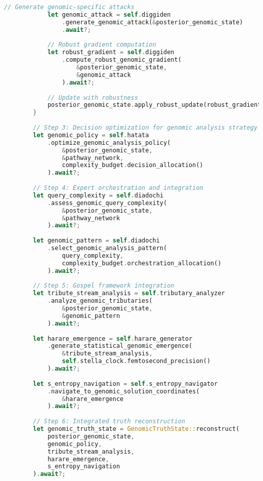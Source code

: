 \documentclass[12pt,a4paper]{article}
\begin{document}
\begin{lstlisting}[language=Rust, caption=Honjo Masamune Genomic Truth Engine Integration]
            // Generate genomic-specific attacks
            let genomic_attack = self.diggiden
                .generate_genomic_attack(&posterior_genomic_state)
                .await?;
            
            // Robust gradient computation
            let robust_gradient = self.diggiden
                .compute_robust_genomic_gradient(
                    &posterior_genomic_state,
                    &genomic_attack
                ).await?;
            
            // Update with robustness
            posterior_genomic_state.apply_robust_update(robust_gradient).await?;
        }
        
        // Step 3: Decision optimization for genomic analysis strategy
        let genomic_policy = self.hatata
            .optimize_genomic_analysis_policy(
                &posterior_genomic_state,
                &pathway_network,
                complexity_budget.decision_allocation()
            ).await?;
        
        // Step 4: Expert orchestration and integration
        let query_complexity = self.diadochi
            .assess_genomic_query_complexity(
                &posterior_genomic_state,
                &pathway_network
            ).await?;
        
        let genomic_pattern = self.diadochi
            .select_genomic_analysis_pattern(
                query_complexity,
                complexity_budget.orchestration_allocation()
            ).await?;
        
        // Step 5: Gospel framework integration
        let tribute_stream_analysis = self.tributary_analyzer
            .analyze_genomic_tributaries(
                &posterior_genomic_state,
                &genomic_pattern
            ).await?;
        
        let harare_emergence = self.harare_generator
            .generate_statistical_genomic_emergence(
                &tribute_stream_analysis,
                self.stella_clock.femtosecond_precision()
            ).await?;
        
        let s_entropy_navigation = self.s_entropy_navigator
            .navigate_to_genomic_solution_coordinates(
                &harare_emergence
            ).await?;
        
        // Step 6: Integrated truth reconstruction
        let genomic_truth_state = GenomicTruthState::reconstruct(
            posterior_genomic_state,
            genomic_policy,
            tribute_stream_analysis,
            harare_emergence,
            s_entropy_navigation
        ).await?;
        

\end{lstlisting}
\end{document}
